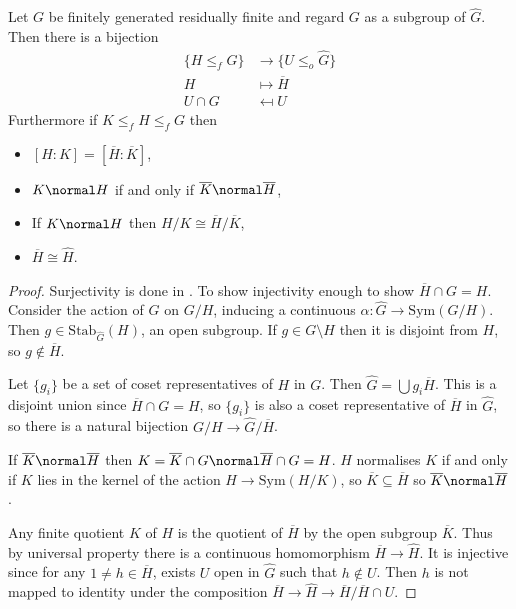 \documentclass[a4paper]{article}
\begin{document}
\begin{proposition}
  Let \(G\) be finitely generated residually finite and regard \(G\) as a subgroup of \(\hat G\). Then there is a bijection
  \begin{align*}
    \{H \leq_f G\} &\to \{U \leq_o \hat G\} \\
    H &\mapsto \overline H \\
    U \cap G &\mapsfrom U
  \end{align*}
  Furthermore if \(K \leq_f H \leq_f G\) then
  \begin{itemize}
  \item \([H : K] = [\overline H: \overline K]\),
  \item \(K \normal H\) if and only if \(\overline K \normal \overline H\),
  \item If \(K \normal H\) then \(H/K \cong \overline H/\overline K\),
  \item \(\overline H \cong \hat H\).
  \end{itemize}
\end{proposition}

\begin{proof}
  Surjectivity is done in . To show injectivity enough to show \(\overline H \cap G = H\). Consider the action of \(G\) on \(G/H\), inducing a continuous \(\alpha: \hat G \to \mathrm{Sym}(G/H)\). Then \(g \in \mathrm{Stab}_{\hat G}(H)\), an open subgroup. If \(g \in G \setminus H\) then it is disjoint from \(H\), so \(g \notin \overline H\).

  Let \(\{g_i\}\) be a set of coset representatives of \(H\) in \(G\). Then \(\hat G = \bigcup g_i \overline H\). This is a disjoint union since \(\overline H \cap G = H\), so \(\{g_i\}\) is also a coset representative of \(\overline H\) in \(\hat G\), so there is a natural bijection \(G/H \to \hat G/\overline H\).

  If \(\overline K \normal \overline H\) then \(K = \overline K \cap G \normal \overline H \cap G = H\). \(H\) normalises \(K\) if and only if \(K\) lies in the kernel of the action \(H \to \mathrm{Sym}(H/K)\), so \(\overline K \subseteq \overline H\) so \(\overline K \normal \overline H\).

  Any finite quotient \(K\) of \(H\) is the quotient of \(\overline H\) by the open subgroup \(\overline K\). Thus by universal property there is a continuous homomorphism \(\overline H \to \hat H\). It is injective since for any \(1 \ne h \in \overline H\), exists \(U\) open in \(\hat G\) such that \(h \notin U\). Then \(h\) is not mapped to identity under the composition \(\overline H \to \hat H \to \overline H/\overline H \cap U\).
\end{proof}
\end{document}
